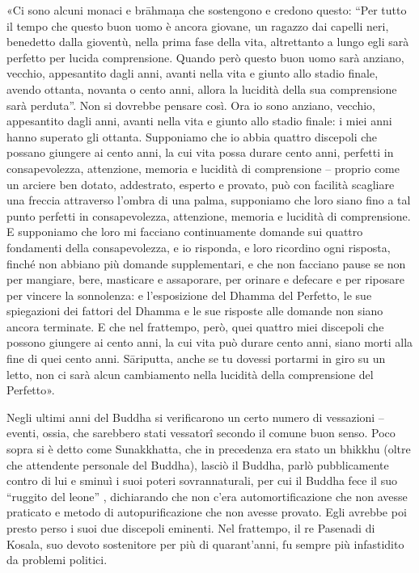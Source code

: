 «Ci sono alcuni monaci e brāhmaṇa che sostengono e credono questo: “Per
tutto il tempo che questo buon uomo è ancora giovane, un ragazzo dai
capelli neri, benedetto dalla gioventù, nella prima fase della vita,
altrettanto a lungo egli sarà perfetto per lucida comprensione. Quando
però questo buon uomo sarà anziano, vecchio, appesantito dagli anni,
avanti nella vita e giunto allo stadio finale, avendo ottanta, novanta o
cento anni, allora la lucidità della sua comprensione sarà perduta”. Non
si dovrebbe pensare così. Ora io sono anziano, vecchio, appesantito
dagli anni, avanti nella vita e giunto allo stadio finale: i miei anni
hanno superato gli ottanta. Supponiamo che io abbia quattro discepoli
che possano giungere ai cento anni, la cui vita possa durare cento anni,
perfetti in consapevolezza, attenzione, memoria e lucidità di
comprensione – proprio come un arciere ben dotato, addestrato, esperto e
provato, può con facilità scagliare una freccia attraverso l’ombra di
una palma, supponiamo che loro siano fino a tal punto perfetti in
consapevolezza, attenzione, memoria e lucidità di comprensione. E
supponiamo che loro mi facciano continuamente domande sui quattro
fondamenti della consapevolezza, e io risponda, e loro ricordino ogni
risposta, finché non abbiano più domande supplementari, e che non
facciano pause se non per mangiare, bere, masticare e assaporare, per
orinare e defecare e per riposare per vincere la sonnolenza: e
l’esposizione del Dhamma del Perfetto, le sue spiegazioni dei fattori
del Dhamma e le sue risposte alle domande non siano ancora terminate. E
che nel frattempo, però, quei quattro miei discepoli che possono
giungere ai cento anni, la cui vita può durare cento anni, siano morti
alla fine di quei cento anni. Sāriputta, anche se tu dovessi portarmi in
giro su un letto, non ci sarà alcun cambiamento nella lucidità della
comprensione del Perfetto».




 Negli ultimi anni del Buddha si verificarono un certo
numero di vessazioni – eventi, ossia, che sarebbero stati vessatorî
secondo il comune buon senso. Poco sopra si è detto come Sunakkhatta,
che in precedenza era stato un bhikkhu (oltre che attendente personale
del Buddha), lasciò il Buddha, parlò pubblicamente contro di lui e
sminuì i suoi poteri sovrannaturali, per cui il Buddha fece il suo
“ruggito del leone” , dichiarando che non c’era automortificazione che
non avesse praticato e metodo di autopurificazione che non avesse
provato. Egli avrebbe poi presto perso i suoi due discepoli eminenti.
Nel frattempo, il re Pasenadi di Kosala, suo devoto sostenitore per più
di quarant’anni, fu sempre più infastidito da problemi politici.


